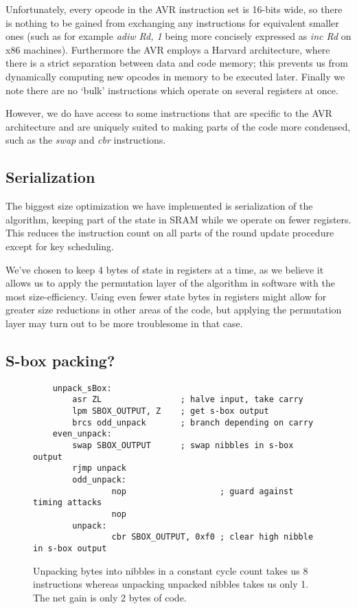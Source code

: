 \documentclass{llncs}
\begin{document}
Unfortunately, every opcode in the AVR instruction set is 16-bits wide, so there is nothing to be gained from exchanging any instructions for equivalent smaller ones (such as for example \textit{adiw Rd, 1} being more concisely expressed as \textit{inc Rd} on x86 machines).
Furthermore the AVR employs a Harvard architecture, where there is a strict separation between data and code memory; this prevents us from dynamically computing new opcodes in memory to be executed later.
Finally we note there are no `bulk' instructions which operate on several registers at once.

However, we do have access to some instructions that are specific to the AVR architecture and are uniquely suited to making parts of the code more condensed, such as the \textit{swap} and \textit{cbr} instructions.

\subsection{Serialization}
The biggest size optimization we have implemented is serialization of the algorithm, keeping part of the state in SRAM while we operate on fewer registers.
This reduces the instruction count on all parts of the round update procedure except for key scheduling.

We've chosen to keep 4 bytes of state in registers at a time, as we believe it allows us to apply the permutation layer of the algorithm in software with the most size-efficiency.
Using even fewer state bytes in registers might allow for greater size reductions in other areas of the code, but applying the permutation layer may turn out to be more troublesome in that case.

\subsection{S-box packing?}
\begin{figure}
\begin{lstlisting}
	unpack_sBox:
		asr ZL                ; halve input, take carry
		lpm SBOX_OUTPUT, Z    ; get s-box output
		brcs odd_unpack       ; branch depending on carry
	even_unpack:
		swap SBOX_OUTPUT      ; swap nibbles in s-box output
		rjmp unpack
        odd_unpack:
                nop                   ; guard against timing attacks
                nop
        unpack:
                cbr SBOX_OUTPUT, 0xf0 ; clear high nibble in s-box output
	\end{lstlisting}
	\caption{Unpacking bytes into nibbles in a constant cycle count takes us 8 instructions whereas unpacking unpacked nibbles takes us only 1. The net gain is only 2 bytes of code.}
\label{unpacking_code}
\end{figure}
\end{document}
